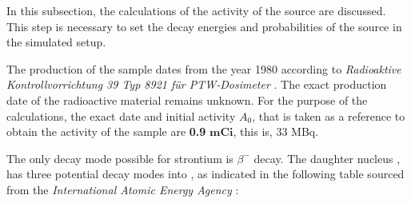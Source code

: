 In this subsection, the calculations of the activity of the source are discussed. This step is necessary to set the decay energies and probabilities of the source in the simulated setup. 

The production of the  sample dates from the year 1980 according to \emph{Radioaktive Kontrollvorrichtung 39 Typ 8921 für PTW-Dosimeter} \cite{kontrollvorrichtung}. The exact production date of the radioactive material remains unknown. For the purpose of the calculations, the exact date and initial activity $A_0$, that is taken as a reference to obtain the activity of the sample are \textbf{0.9} $\boldsymbol{mCi}$, this is, 33 \unit{\mega\becquerel}. 

The only decay mode possible for strontium is $\beta^-$ decay. The daughter nucleus , has three potential decay modes into , as indicated in the following table sourced from the \textit{International Atomic Energy Agency} \cite{intlAtomicEnergy}:

